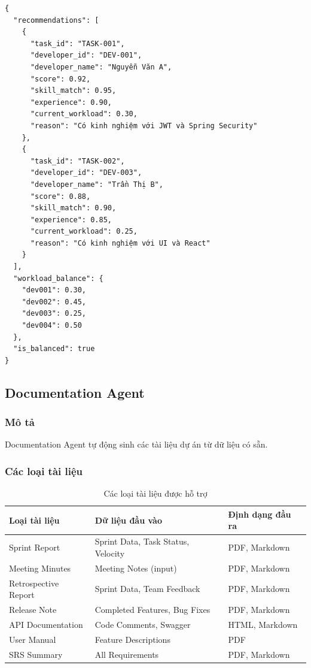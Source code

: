 \documentclass[12pt,a4paper]{report}
\begin{document}
\begin{verbatim}
{
  "recommendations": [
    {
      "task_id": "TASK-001",
      "developer_id": "DEV-001",
      "developer_name": "Nguyễn Văn A",
      "score": 0.92,
      "skill_match": 0.95,
      "experience": 0.90,
      "current_workload": 0.30,
      "reason": "Có kinh nghiệm với JWT và Spring Security"
    },
    {
      "task_id": "TASK-002",
      "developer_id": "DEV-003",
      "developer_name": "Trần Thị B",
      "score": 0.88,
      "skill_match": 0.90,
      "experience": 0.85,
      "current_workload": 0.25,
      "reason": "Có kinh nghiệm với UI và React"
    }
  ],
  "workload_balance": {
    "dev001": 0.30,
    "dev002": 0.45,
    "dev003": 0.25,
    "dev004": 0.50
  },
  "is_balanced": true
}
\end{verbatim}

\subsection{Documentation Agent}

\subsubsection{Mô tả}

Documentation Agent tự động sinh các tài liệu dự án từ dữ liệu có sẵn.

\subsubsection{Các loại tài liệu}

\begin{table}[H]
\centering
\caption{Các loại tài liệu được hỗ trợ}
\begin{tabular}{|p{4cm}|p{4.5cm}|p{5cm}|}
\hline
\textbf{Loại tài liệu} & \textbf{Dữ liệu đầu vào} & \textbf{Định dạng đầu ra} \\
\hline
Sprint Report & Sprint Data, Task Status, Velocity & PDF, Markdown \\
\hline
Meeting Minutes & Meeting Notes (input) & PDF, Markdown \\
\hline
Retrospective Report & Sprint Data, Team Feedback & PDF, Markdown \\
\hline
Release Note & Completed Features, Bug Fixes & PDF, Markdown \\
\hline
API Documentation & Code Comments, Swagger & HTML, Markdown \\
\hline
User Manual & Feature Descriptions & PDF \\
\hline
SRS Summary & All Requirements & PDF, Markdown \\
\hline
\end{tabular}
\label{tab:document_types}
\end{table}
\end{document}
